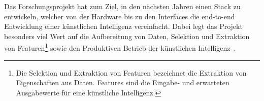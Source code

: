 Das Forschungsprojekt hat zum Ziel, in den nächsten Jahren einen Stack zu entwickeln, welcher von der Hardware bis zu den Interfaces die end-to-end Entwicklung einer künstlichen Intelligenz vereinfacht. Dabei legt das Projekt besonders viel Wert auf die Aufbereitung von Daten, Selektion und Extraktion von Featuren\footnote{Die Selektion und Extraktion von Featuren bezeichnet die Extraktion von Eigenschaften aus Daten. Features sind die Eingabe- und erwarteten Ausgabewerte für eine künstliche Intelligenz.} sowie den Produktiven Betrieb der künstlichen Intelligenz~\autocite{DAWN}.
